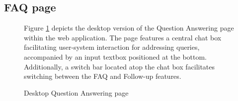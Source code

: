\documentclass[12pt,oneside,openright,a4paper]{cpe-english-project}
\begin{document}
    \subsection{FAQ page}
    \begin{figure}[!h]
      \centering
      \caption{Desktop Question Answering page}\label{fig:Desk_FAQ}
      \begin{justify}
        \qquad Figure \ref{fig:Desk_FAQ} depicts the desktop version of the Question Answering page within the web application. The page features a central chat box facilitating user-system interaction for addressing queries, accompanied by an input textbox positioned at the bottom. Additionally, a switch bar located atop the chat box facilitates switching between the FAQ and Follow-up features. \par
      \end{justify}
    \end{figure}
\end{document}
